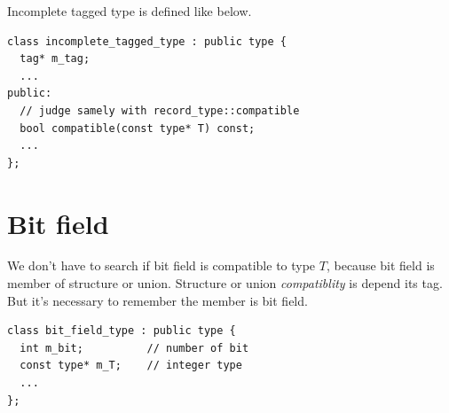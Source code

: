Incomplete tagged type is defined like below.
\begin{verbatim}
class incomplete_tagged_type : public type {
  tag* m_tag;
  ...
public:
  // judge samely with record_type::compatible
  bool compatible(const type* T) const;
  ...
};
\end{verbatim}

\section{Bit field}

We don't have to search if bit field is compatible
to type $T$, because bit field is member of structure
or union. Structure or union {\it compatiblity} is
depend its tag. But it's necessary to remember
the member is bit field.

\begin{verbatim}
class bit_field_type : public type {
  int m_bit;          // number of bit
  const type* m_T;    // integer type
  ...
};
\end{verbatim}
